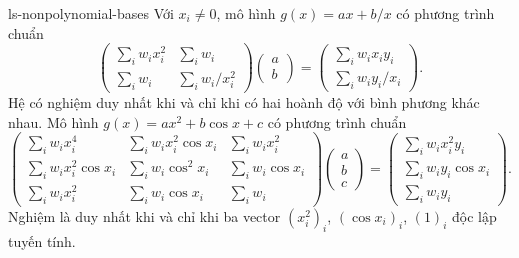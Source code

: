 \documentclass[12pt,a4paper,oneside]{book}
\numberwithin{algorithm}{chapter}
\theoremstyle{definition}
\begin{document}
\begin{menhde}{}{ls-nonpolynomial-bases}
Với $x_i\ne0$, mô hình $g(x)=ax+b/x$ có phương trình chuẩn
\begin{equation}\label{eq:ls-reciprocal-model}
 \begin{pmatrix}\sum_iw_ix_i^2&\sum_iw_i\\
                 \sum_iw_i&\sum_iw_i/x_i^2\end{pmatrix}
 \begin{pmatrix}a\\b\end{pmatrix}
 =\begin{pmatrix}\sum_iw_ix_iy_i\\\sum_iw_iy_i/x_i\end{pmatrix}.
\end{equation}
Hệ có nghiệm duy nhất khi và chỉ khi có hai hoành độ với bình phương khác nhau.
Mô hình $g(x)=ax^2+b\cos x+c$ có phương trình chuẩn
\begin{equation}\label{eq:ls-cosine-model}
 \begin{pmatrix}
 \sum_iw_ix_i^4&\sum_iw_ix_i^2\cos x_i&\sum_iw_ix_i^2\\
 \sum_iw_ix_i^2\cos x_i&\sum_iw_i\cos^2x_i&\sum_iw_i\cos x_i\\
 \sum_iw_ix_i^2&\sum_iw_i\cos x_i&\sum_iw_i
 \end{pmatrix}
 \begin{pmatrix}a\\b\\c\end{pmatrix}
 =\begin{pmatrix}\sum_iw_ix_i^2y_i\\\sum_iw_iy_i\cos x_i\\\sum_iw_iy_i\end{pmatrix}.
\end{equation}
Nghiệm là duy nhất khi và chỉ khi ba vector $(x_i^2)_i$, $(\cos x_i)_i$, $(1)_i$ độc lập tuyến tính.
\end{menhde}
\end{document}
